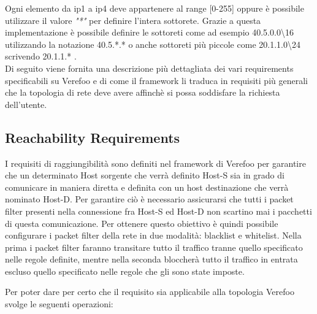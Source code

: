 Ogni elemento da ip1 a ip4 deve appartenere al range [0-255] oppure è possibile utilizzare il valore \textit{"*"} per definire l'intera sottorete.
Grazie a questa implementazione è possibile definire le sottoreti come ad esempio 40.5.0.0\textbackslash16 utilizzando la notazione 40.5.*.* o anche sottoreti
più piccole come 20.1.1.0\textbackslash24 scrivendo 20.1.1.* . \\

Di seguito viene fornita una descrizione più dettagliata dei vari requirements specificabili su Verefoo e di come il framework li traduca in requisiti più generali che la topologia
di rete deve avere affinchè si possa soddisfare la richiesta dell'utente.

\subsection{Reachability Requirements}

I requisiti di raggiungibilità sono definiti nel framework di Verefoo per garantire che un determinato Host sorgente che verrà definito Host-S sia 
in grado di comunicare in maniera diretta e definita con un host destinazione che verrà nominato Host-D. Per garantire ciò è necessario assicurarsi che tutti i 
packet filter presenti nella connessione fra Host-S ed Host-D non scartino mai i pacchetti di questa comunicazione. Per ottenere questo obiettivo è quindi possibile
configurare i packet filter della rete in due modalità: blacklist e whitelist. Nella prima i packet filter faranno transitare tutto il traffico tranne quello specificato
nelle regole definite, mentre nella seconda bloccherà tutto il traffico in entrata escluso quello specificato nelle regole che gli sono state imposte.

Per poter dare per certo che il requisito sia applicabile alla topologia Verefoo svolge le seguenti operazioni\cite{cit2}:

